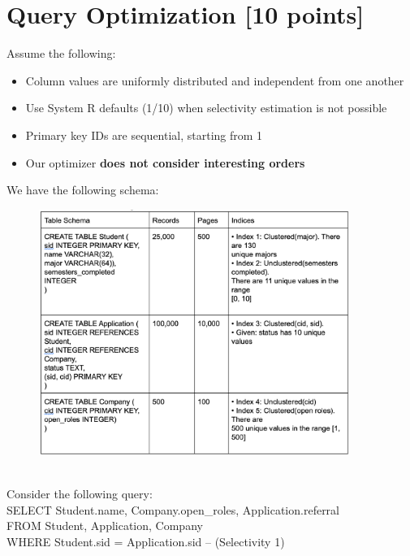 \documentclass[10pt]{article}
\begin{document}
\newpage


\section{ \textbf{Query Optimization  [10 points]}}
Assume the following:
\begin{itemize}
    \item Column values are uniformly distributed and independent from one another
    \item Use System R defaults (1/10) when selectivity estimation is not possible
    \item Primary key IDs are sequential, starting from 1
    \item Our optimizer \textbf{does not consider interesting orders}
\end{itemize}
We have the following schema:
\begin{figure}[h]\centering\includegraphics[height=8cm]{query_opt.png}\end{figure}\\
Consider the following query:\\
SELECT Student.name, Company.open\_roles, Application.referral\\
FROM Student, Application, Company\\
WHERE Student.sid = Application.sid \hfill -- (Selectivity 1)\\
\end{document}
